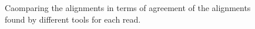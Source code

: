 \begin{figure}
    \centering
    \caption[Upset plots for comparing the alignments - reads agreement]
    {Caomparing the alignments in terms of 
    agreement of the alignments found by different tools for each read.}
    \label{fig:upset1}
\end{figure}
